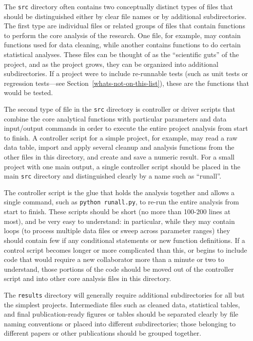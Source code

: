 \documentclass[10pt]{article}
\begin{document}
The \texttt{src} directory often contains two conceptually distinct
types of files that should be distinguished either by clear file names
or by additional subdirectories. The first type are individual files
or related groups of files that contain functions to perform the core
analysis of the research. One file, for example, may contain functions
used for data cleaning, while another contains functions to do certain
statistical analyses. These files can be thought of as the
``scientific guts'' of the project, and as the project grows, they can
be organized into additional subdirectories. If a project were to
include re-runnable tests (such as unit tests or regression
tests---see Section~\ref{whats-not-on-this-list}), these are the
functions that would be tested.

The second type of file in the \texttt{src} directory is controller or
driver scripts that combine the core analytical functions with
particular parameters and data input/output commands in order to execute
the entire project analysis from start to finish. A controller script
for a simple project, for example, may read a raw data table, import and
apply several cleanup and analysis functions from the other files in
this directory, and create and save a numeric result. For a small
project with one main output, a single controller script should be
placed in the main \texttt{src} directory and distinguished clearly by a
name such as ``runall''.

The controller script is the glue that holds the analysis together and
allows a single command, such as \texttt{python runall.py}, to re-run
the entire analysis from start to finish. These scripts should be short
(no more than 100-200 lines at most), and be very easy to understand: in
particular, while they may contain loops (to process multiple data files
or sweep across parameter ranges) they should contain few if any
conditional statements or new function definitions. If a control script
becomes longer or more complicated than this, or begins to include code
that would require a new collaborator more than a minute or two to
understand, those portions of the code should be moved out of the
controller script and into other core analysis files in this directory.

The \texttt{results} directory will generally require additional
subdirectories for all but the simplest projects. Intermediate files
such as cleaned data, statistical tables, and final publication-ready
figures or tables should be separated clearly by file naming conventions
or placed into different subdirectories; those belonging to different
papers or other publications should be grouped together.
\end{document}

